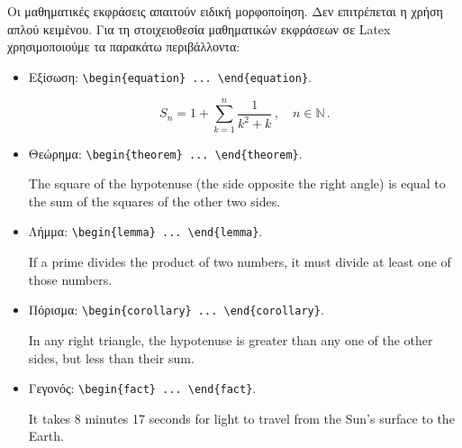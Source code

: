 Οι μαθηματικές εκφράσεις απαιτούν ειδική μορφοποίηση.
Δεν επιτρέπεται η χρήση απλού κειμένου.
Για τη στοιχειοθεσία μαθηματικών εκφράσεων σε Latex χρησιμοποιούμε
τα παρακάτω περιβάλλοντα:
\begin{itemize}
	\item Εξίσωση: \verb|\begin{equation} ... \end{equation}|.

	\begin{equation}
		S_{n} = 1 + \sum_{k=1}^{n}\frac{1}{k^{2} + k}\,,\quad n \in \mathbb{N}\,.
		\label{eq:Example}
	\end{equation}

	\item Θεώρημα: \verb|\begin{theorem} ... \end{theorem}|.

	\begin{theorem}
		Τhe square of the hypotenuse (the side opposite the right angle) is equal 
		to the sum of the squares of the other two sides.
	\end{theorem}

	\item Λήμμα: \verb|\begin{lemma} ... \end{lemma}|.

	\begin{lemma}
		If a prime divides the product of two numbers, it must divide at least 
		one of those numbers.
	\end{lemma}

	\item Πόρισμα: \verb|\begin{corollary} ... \end{corollary}|.

	\begin{corollary}
		In any right triangle, the hypotenuse is greater than any one of the 
		other sides, but less than their sum.
	\end{corollary}

	\item Γεγονός: \verb|\begin{fact} ... \end{fact}|.

	\begin{fact}
		It takes 8 minutes 17 seconds for light to travel from the Sun’s surface 
		to the Earth.
	\end{fact}


\end{itemize}

